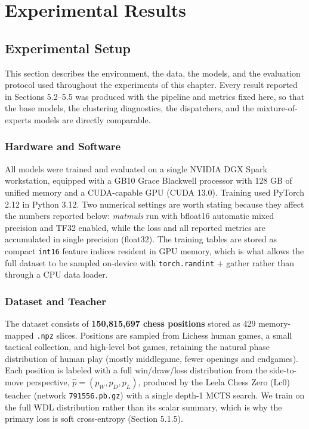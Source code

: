 \chapter{Experimental Results}



\section{Experimental Setup}

This section describes the environment, the data, the models, and the evaluation protocol used throughout the experiments of this chapter. Every result reported in Sections 5.2--5.5 was produced with the pipeline and metrics fixed here, so that the base models, the clustering diagnostics, the dispatchers, and the mixture-of-experts models are directly comparable.

\subsection{Hardware and Software}

All models were trained and evaluated on a single NVIDIA DGX Spark workstation, equipped with a GB10 Grace Blackwell processor with 128 GB of unified memory and a CUDA-capable GPU (CUDA 13.0). Training used PyTorch 2.12 in Python 3.12. Two numerical settings are worth stating because they affect the numbers reported below: \emph{matmuls} run with bfloat16 automatic mixed precision and TF32 enabled, while the loss and all reported metrics are accumulated in single precision (float32). The training tables are stored as compact \texttt{int16} feature indices resident in GPU memory, which is what allows the full dataset to be sampled on-device with \texttt{torch.randint} + gather rather than through a CPU data loader.

\subsection{Dataset and Teacher}

The dataset consists of \textbf{150,815,697 chess positions} stored as 429 memory-mapped \texttt{.npz} slices. Positions are sampled from Lichess human games, a small tactical collection, and high-level bot games, retaining the natural phase distribution of human play (mostly middlegame, fewer openings and endgames). Each position is labeled with a full win/draw/loss distribution from the side-to-move perspective, $\hat{p} = (p_W, p_D, p_L)$, produced by the Leela Chess Zero (Lc0) teacher (network \texttt{791556.pb.gz}) with a single depth-1 MCTS search. We train on the full WDL distribution rather than its scalar summary, which is why the primary loss is soft cross-entropy (Section 5.1.5).

